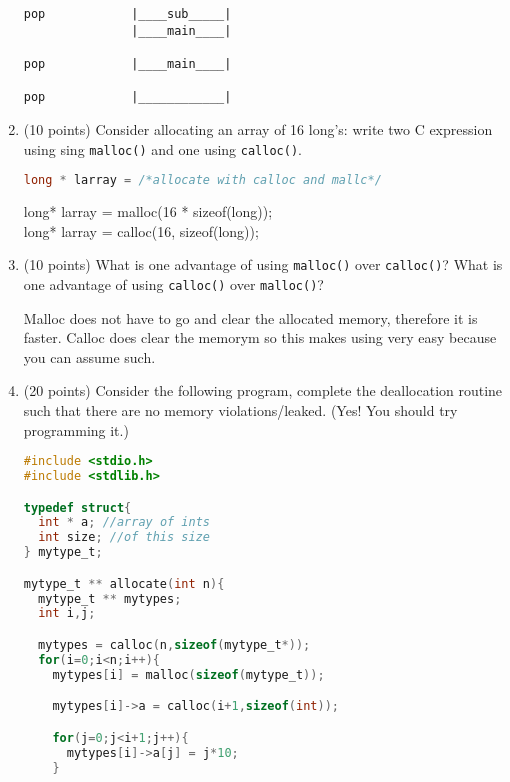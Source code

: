 \documentclass{article}[9pt]
\newenvironment{answerfont}{\fontfamily{qhv}\selectfont}{\par}
\newenvironment{myanswer}{\begin{mdframed}\begin{answerfont}}{\end{answerfont}\end{mdframed}}
\begin{document}
\begin{enumerate}
\begin{myanswer}
\begin{lstlisting}
pop            |____sub_____|
               |____main____|

pop            |____main____|

pop            |____________|

\end{lstlisting}
\end{myanswer}


\item (10 points) Consider allocating an array of 16 long's: write two C expression using sing \texttt{malloc()} and one using \texttt{calloc()}.

\begin{lstlisting}[language=c]
long * larray = /*allocate with calloc and mallc*/
\end{lstlisting}

\begin{myanswer}
long* larray = malloc(16 * sizeof(long));\\
long* larray = calloc(16, sizeof(long));
\end{myanswer}

\item (10 points) What is one advantage of using \texttt{malloc()} over \texttt{calloc()}? What
is one advantage of using \texttt{calloc()} over \texttt{malloc()}?

\begin{myanswer}
Malloc does not have to go and clear the allocated memory, therefore it
is faster.
Calloc does clear the memorym so this makes using very easy because you
can assume such.
\end{myanswer}

\item (20 points) Consider the following program, complete the deallocation routine
such that there are no memory violations/leaked. (Yes! You should
try programming it.)

\begin{lstlisting}[language=c]
#include <stdio.h>
#include <stdlib.h>

typedef struct{
  int * a; //array of ints
  int size; //of this size
} mytype_t;

mytype_t ** allocate(int n){
  mytype_t ** mytypes;
  int i,j;

  mytypes = calloc(n,sizeof(mytype_t*));
  for(i=0;i<n;i++){
    mytypes[i] = malloc(sizeof(mytype_t));

    mytypes[i]->a = calloc(i+1,sizeof(int));

    for(j=0;j<i+1;j++){
      mytypes[i]->a[j] = j*10;
    }


\end{lstlisting}
\end{enumerate}
\end{document}
